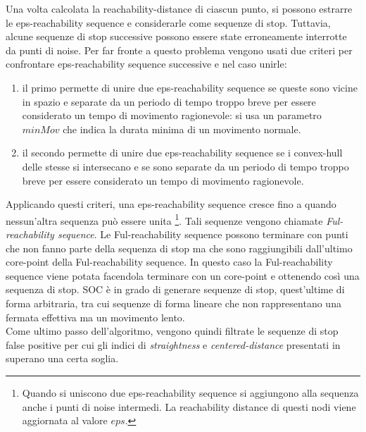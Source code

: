 \documentclass[12pt]{article}
\begin{document}
Una volta calcolata la reachability-distance di ciascun punto, si possono estrarre le eps-reachability sequence e considerarle come sequenze di stop.
Tuttavia, alcune sequenze di stop successive possono essere state erroneamente interrotte da punti di noise.
Per far fronte a questo problema vengono usati due criteri per confrontare eps-reachability sequence successive e nel caso unirle:
\begin{enumerate}
    \item il primo permette di unire due eps-reachability sequence se queste sono vicine in spazio e separate da un periodo di tempo troppo breve per essere considerato un tempo di movimento ragionevole: si usa un parametro $minMov$ che indica la durata minima di un movimento normale.
    \item il secondo permette di unire due eps-reachability sequence se i convex-hull delle stesse si intersecano e se sono separate da un periodo di tempo troppo breve per essere considerato un tempo di movimento ragionevole.
\end{enumerate}
Applicando questi criteri, una eps-reachability sequence cresce fino a quando nessun'altra sequenza può essere unita \footnote{Quando si uniscono due eps-reachability sequence si aggiungono alla sequenza anche i punti di noise intermedi. La reachability distance di questi nodi viene aggiornata al valore $eps$.}.
Tali sequenze vengono chiamate \emph{Ful-reachability sequence}. Le Ful-reachability sequence possono terminare con punti che non fanno parte della sequenza di stop ma che sono raggiungibili dall'ultimo core-point della Ful-reachability sequence.
In questo caso la Ful-reachability sequence viene potata facendola terminare con un core-point e ottenendo così una sequenza di stop.
SOC è in grado di generare sequenze di stop, quest'ultime di forma arbitraria, tra cui sequenze di forma lineare che non rappresentano una fermata effettiva ma un movimento lento.\\
Come ultimo passo dell'algoritmo, vengono quindi filtrate le sequenze di stop false positive per cui gli indici di \emph{straightness} e \emph{centered-distance} presentati in \cite{SequenceClustering} superano una certa soglia.
\end{document}

